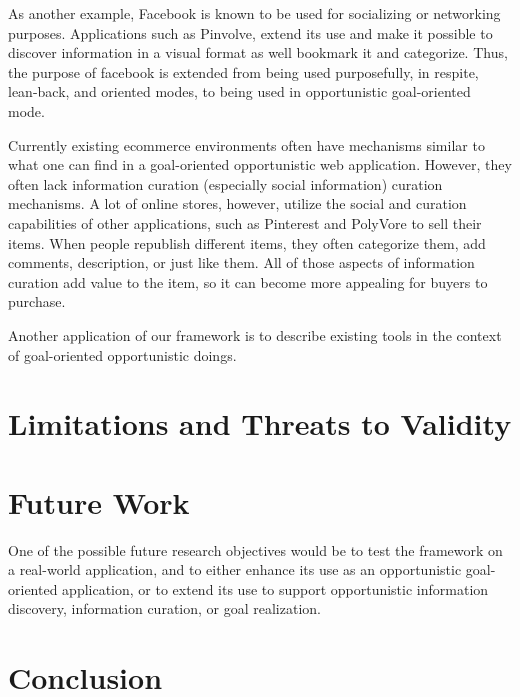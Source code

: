 \documentclass{casconpaper}
\begin{document}
{As another example, Facebook is known to be used for socializing or networking purposes.  Applications such as Pinvolve, extend its use and make it possible to discover information in a visual format as well bookmark it and categorize. Thus, the purpose  of facebook is extended from being used purposefully, in respite, lean-back, and oriented modes, to being used in opportunistic goal-oriented mode. 

Currently existing ecommerce environments often have mechanisms similar to what one can find in a goal-oriented opportunistic web application. However,  they often lack information curation (especially social information) curation mechanisms. A lot of online stores, however, utilize the social and curation capabilities of other applications, such as Pinterest and PolyVore to sell their items. When people republish different items, they often categorize them, add comments, description, or just like them. All of those aspects of information curation add value to the item, so it can become more appealing for buyers to purchase. 

Another application of our framework is to describe existing tools in the context of goal-oriented opportunistic doings. 
} %


{\section{Limitations and Threats to Validity}

} %

{\section{ Future Work}
One of the possible future research objectives would be to test the framework on a real-world application, and to either enhance its use as an opportunistic goal-oriented application, or to extend its use  to support opportunistic information discovery, information curation, or goal realization. 

} %

{\section{Conclusion}
 
} %
\end{document}
